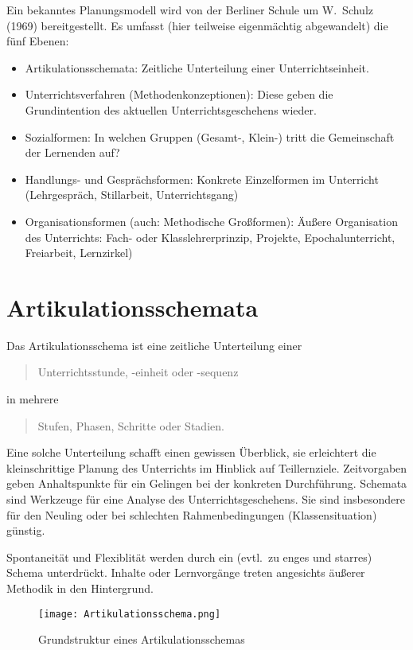 Ein bekanntes Planungsmodell wird von der Berliner Schule um
W.\ Schulz (1969) bereitgestellt.
Es umfasst (hier teilweise eigenm\"{a}chtig abgewandelt) die
f\"{u}nf Ebenen:
\begin{itemize}
	\item
	Artikulationsschemata: Zeitliche Unterteilung
	einer Unterrichtseinheit.
	\item
	Unterrichtsverfahren (Methodenkonzeptionen):
	Diese geben die Grundintention des aktuellen Unterrichtsgeschehens
	wieder.
	\item
	Sozialformen:
	In welchen Gruppen (Gesamt-, Klein-) tritt die Gemeinschaft der Lernenden auf?
	\item
	Handlungs- und Gespr\"{a}chsformen: Konkrete Einzelformen im
	Unterricht (Lehrgespr\"{a}ch, Stillarbeit, Unterrichtsgang)
	\item
	Organisationsformen (auch: Methodische Gro{\ss}formen):
	\"{A}u{\ss}ere Organisation des Unterrichts: Fach-
	oder Klasslehrerprinzip, Projekte, Epochalunterricht,
	Freiarbeit, Lernzirkel)
\end{itemize}

\bip\bip
\section{Artikulationsschemata}


Das Artikulationsschema ist eine zeitliche Unterteilung einer
\begin{quote}
	Unterrichtsstunde, -einheit oder -sequenz
\end{quote}
in mehrere
\begin{quote}
	Stufen, Phasen, Schritte oder Stadien.
\end{quote}

 Eine solche Unterteilung schafft einen gewissen
\"{U}berblick, sie erleichtert die kleinschrittige Planung des
Unterrichts im Hinblick auf Teillernziele.
Zeitvorgaben geben Anhaltspunkte f\"{u}r ein Gelingen bei der
konkreten Durchf\"{u}hrung.
Schemata sind Werkzeuge f\"{u}r eine Analyse des
Unterrichtsgeschehens.
Sie sind insbesondere f\"{u}r den Neuling oder bei schlechten
Rahmenbedingungen (Klassensituation) g\"{u}nstig.

 Spontaneit\"{a}t und Flexiblit\"{a}t werden durch ein
(evtl.\ zu enges und starres) Schema unterdr\"{u}ckt.
Inhalte oder Lernvorg\"{a}nge treten angesichts \"{a}u{\ss}erer
Methodik in den Hintergrund.

\begin{figure}[b]
	\centering
	\texttt{[image: Artikulationsschema.png]}
	\caption{Grundstruktur eines Artikulationsschemas}
	\label{fig:Artikulationsschema}
\end{figure}


